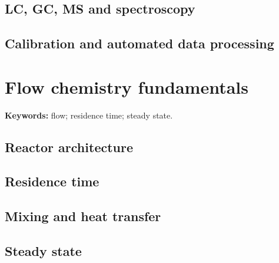 
\subsection{LC, GC, MS and spectroscopy}


\subsection{Calibration and automated data processing}


\section{Flow chemistry fundamentals}

\begin{conceptbox}
\textbf{Keywords:} flow; residence time; steady state.
\end{conceptbox}

\subsection{Reactor architecture}


\subsection{Residence time}


\subsection{Mixing and heat transfer}


\subsection{Steady state}


